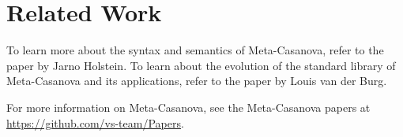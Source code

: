 \section{Related Work}
To learn more about the syntax and semantics of Meta-Casanova, refer to the paper by Jarno Holstein\cite{holstein16}.
To learn about the evolution of the standard library of Meta-Casanova and its applications, refer to the paper by Louis van der Burg\cite{vanderburg16}.

For more information on Meta-Casanova, see the Meta-Casanova papers at \url{https://github.com/vs-team/Papers}.

